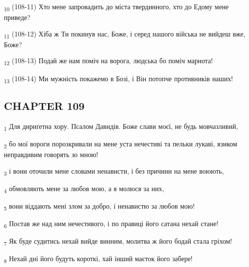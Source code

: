 \begin{tcolorbox}
\textsubscript{10} (108-11) Хто мене запровадить до міста твердинного, хто до Едому мене приведе?
\end{tcolorbox}
\begin{tcolorbox}
\textsubscript{11} (108-12) Хіба ж Ти покинув нас, Боже, і серед нашого війська не вийдеш вже, Боже?
\end{tcolorbox}
\begin{tcolorbox}
\textsubscript{12} (108-13) Подай же нам поміч на ворога, людська бо поміч марнота!
\end{tcolorbox}
\begin{tcolorbox}
\textsubscript{13} (108-14) Ми мужність покажемо в Бозі, і Він потопче противників наших!
\end{tcolorbox}
\subsection{CHAPTER 109}
\begin{tcolorbox}
\textsubscript{1} Для дириґетна хору. Псалом Давидів. Боже слави моєї, не будь мовчазливий,
\end{tcolorbox}
\begin{tcolorbox}
\textsubscript{2} бо мої вороги порозкривали на мене уста нечестиві та пельки лукаві, язиком неправдивим говорять зо мною!
\end{tcolorbox}
\begin{tcolorbox}
\textsubscript{3} і вони оточили мене словами ненависти, і без причини на мене воюють,
\end{tcolorbox}
\begin{tcolorbox}
\textsubscript{4} обмовляють мене за любов мою, а я молюся за них,
\end{tcolorbox}
\begin{tcolorbox}
\textsubscript{5} вони віддають мені злом за добро, і ненавистю за любов мою!
\end{tcolorbox}
\begin{tcolorbox}
\textsubscript{6} Постав же над ним нечестивого, і по правиці його сатана нехай стане!
\end{tcolorbox}
\begin{tcolorbox}
\textsubscript{7} Як буде судитись нехай вийде винним, молитва ж його бодай стала гріхом!
\end{tcolorbox}
\begin{tcolorbox}
\textsubscript{8} Нехай дні його будуть короткі, хай інший маєток його забере!
\end{tcolorbox}
